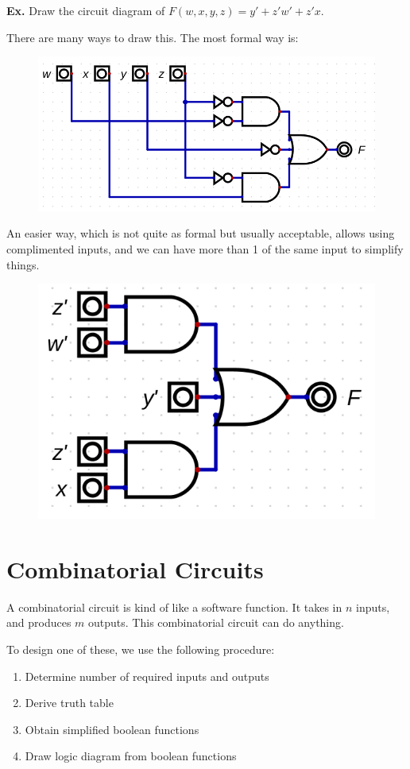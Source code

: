 \documentclass[12pt,letterpaper]{article} \usepackage{amsmath} \usepackage{graphicx}  \usepackage{longtable}  \usepackage{amssymb}
\begin{document}
    \begin{mdframed}
        \textbf{Ex. } Draw the circuit diagram of $F(w,x,y,z)=y'+z'w'+z'x$.

        There are many ways to draw this. The most formal way is:
        \begin{figure}[H]
            \centering
            \includegraphics[width=0.65\linewidth]{ex4.png}
        \end{figure}

        An easier way, which is not quite as formal but usually acceptable, allows using complimented inputs, and we can have more than 1 of the same input to simplify things. 
        \begin{figure}[H]
            \centering
            \includegraphics[width=0.34\linewidth]{ex4-2.png}
        \end{figure}

    \end{mdframed}

    \section{Combinatorial Circuits}
    A combinatorial circuit is kind of like a software function. It takes in $n$ inputs, and produces $m$ outputs. This combinatorial circuit can do anything.

    To design one of these, we use the following procedure:
    \begin{enumerate}[noitemsep]
        \item Determine number of required inputs and outputs
        \item Derive truth table
        \item Obtain simplified boolean functions
        \item Draw logic diagram from boolean functions
    \end{enumerate}
\end{document}
